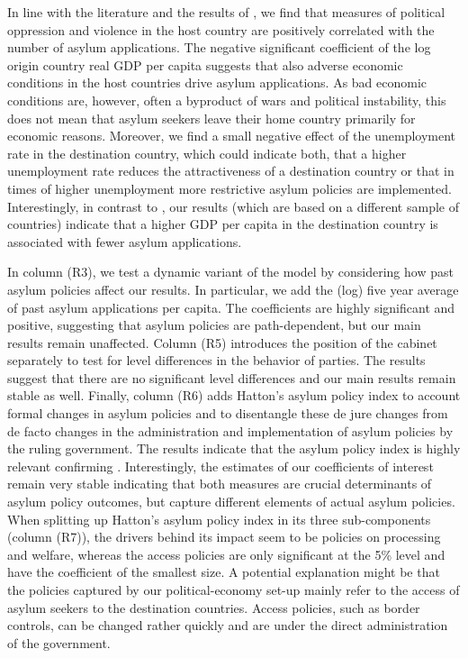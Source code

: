 \documentclass[a4paper,12pt]{article}
\begin{document}
In line with the literature and the results of \citet{hatton2016}, we find that measures of political oppression and violence in the host country are positively correlated with the number of asylum applications. The negative significant coefficient of the log origin country real GDP per capita suggests that also adverse economic conditions in the host countries drive asylum applications. As bad economic conditions are, however, often a byproduct of wars and political instability, this does not mean that asylum seekers leave their home country primarily for economic reasons. Moreover, we find a small negative effect of the unemployment rate in the destination country, which could indicate both, that a higher unemployment rate reduces the attractiveness of a destination country or that in times of higher unemployment more restrictive asylum policies are implemented. Interestingly, in contrast to \citet{hatton2016}, our results (which are based on a different sample of countries) indicate that a higher GDP per capita in the destination country is associated with fewer asylum applications. 

In column (R3), we test a dynamic variant of the model by considering how past asylum policies affect our results. In particular, we add the (log) five year average of past asylum applications per capita. The coefficients are highly significant and positive, suggesting that asylum policies are path-dependent, but our main results remain unaffected. Column (R5) introduces the position of the cabinet separately to test for level differences in the behavior of parties. The results suggest that there are no significant level differences and our main results remain stable as well. Finally, column (R6) adds Hatton's asylum policy index to account formal changes in asylum policies and to disentangle these de jure changes from de facto changes in the administration and implementation of asylum policies by the ruling government. The results indicate that the asylum policy index is highly relevant confirming \citet{hatton2016}. Interestingly, the estimates of our coefficients of interest remain very stable indicating that both measures are crucial determinants of asylum policy outcomes, but capture different elements of actual asylum policies. When splitting up Hatton's asylum policy index in its three sub-components (column (R7)), the drivers behind its impact seem to be policies on processing and welfare, whereas the access policies are only significant at the 5\% level and have the coefficient of the smallest size. A potential explanation might be that the policies captured by our political-economy set-up mainly refer to the access of asylum seekers to the destination countries. Access policies, such as border controls, can be changed rather quickly and are under the direct administration of the government. 
\end{document}
